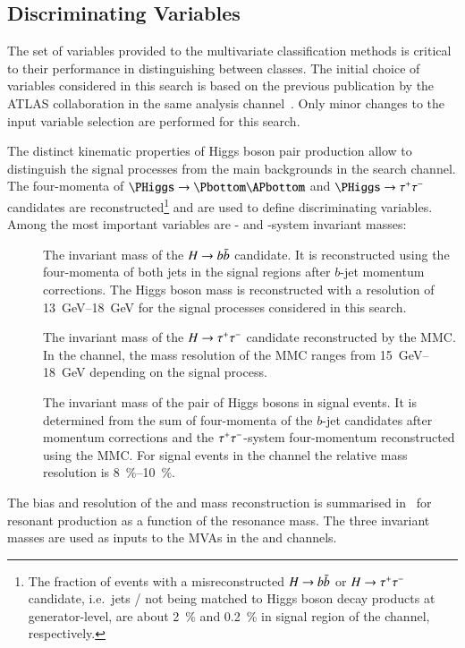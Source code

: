 \subsection{Discriminating Variables}%
\label{sec:mva_discriminating variables}

The set of variables provided to the multivariate classification
methods is critical to their performance in distinguishing between
classes. The initial choice of variables considered in this search is
based on the previous publication by the ATLAS collaboration in the
same analysis channel~\cite{HIGG-2016-16-witherratum}. Only minor
changes to the input variable selection are performed for this search.

The distinct kinematic properties of Higgs boson pair production allow
to distinguish the signal processes from the main backgrounds in the
\bbtautau search channel. The four-momenta of
$\PHiggs \ra \Pbottom\APbottom$ and $\PHiggs \ra \tautau$ candidates
are reconstructed\footnote{The fraction of events with a
  misreconstructed $H \to b\bar{b}$ or $H \to \tau^{+} \tau^{-}$ candidate, i.e.\
  \btagged jets / \tauhadvis not being matched to Higgs boson decay
  products at generator-level, are about \SI{2}{\percent} and
  \SI{0.2}{\percent} in signal region of the \hadhad channel,
  respectively.}  and are used to define discriminating variables.
Among the most important variables are \PHiggs- and \HH-system
invariant masses:
\begin{description}

\item[\mBB] The invariant mass of the $H \to b\bar{b}$ candidate. It is
  reconstructed using the four-momenta of both \btagged jets in the
  signal regions after $b$-jet momentum corrections. The Higgs boson
  mass is reconstructed with a resolution of \SIrange{13}{18}{\GeV}
  for the signal processes considered in this search.

\item[\mMMC] The invariant mass of the $H \to \tau^{+} \tau^{-}$ candidate
  reconstructed by the MMC. In the \hadhad channel, the mass
  resolution of the MMC ranges from \SIrange{15}{18}{\GeV} depending
  on the signal process.

\item[\mHH] The invariant mass of the pair of Higgs bosons in signal
  events. It is determined from the sum of four-momenta of the $b$-jet
  candidates after momentum corrections and the $\tau^{+} \tau^{-}$-system
  four-momentum reconstructed using the MMC. For signal events in the
  \hadhad channel the relative mass resolution is
  \SIrange{8}{10}{\percent}.

\end{description}
The bias and resolution of the \PHiggs and \HH mass reconstruction is
summarised in~\Cref{fig:mass_reconstruction} for resonant \HH
production as a function of the resonance mass. The three invariant
masses are used as inputs to the MVAs in the \hadhad and \lephad
channels.

